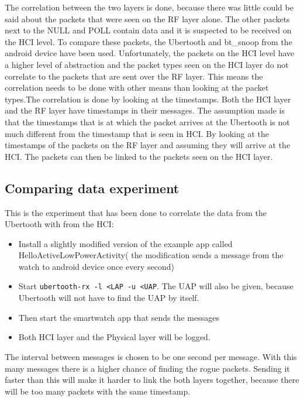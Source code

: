 The correlation between the two layers is done, because there was little could be said about the packets that were seen on the RF layer alone. The other packets next to the NULL and POLL contain data and it is suspected to be received on the HCI level. To compare these packets, the Ubertooth and bt\_snoop from the android device have been used. Unfortunately, the packets on the HCI level have a higher level of abstraction and the packet types seen on the HCI layer do not correlate to the packets that are sent over the RF layer. This means the correlation needs to be done with other means than looking at the packet types.\pend The correlation is done by looking at the timestamps. Both the HCI layer and the RF layer have timestamps in their messages. The assumption made is that the timestamps that is at which the packet arrives at the Ubertooth is not much different from the timestamp that is seen in HCI. By looking at the timestamps of the packets on the RF layer and assuming they will arrive at the HCI. The packets can then be linked to the packets seen on the HCI layer.
\subsection{Comparing data experiment}
This is the experiment that has been done to correlate the data from the Ubertooth with from the HCI:
\begin{itemize}
\item Install a slightly modified version of the example app called HelloActiveLowPowerActivity( the modification sends a message from the watch to android device once every second)
\item Start \verb|ubertooth-rx -l <LAP -u <UAP|. The UAP will also be given, because Ubertooth will not have to find the UAP by itself. 
\item Then start the smartwatch app that sends the messages
\item Both HCI layer and the Physical layer will be logged.
\end{itemize}
The interval between messages is chosen to be one second per message. With this many messages there is a higher chance of finding the rogue packets. Sending it faster than this will make it harder to link the both layers together, because there will be too many packets with the same timestamp.
